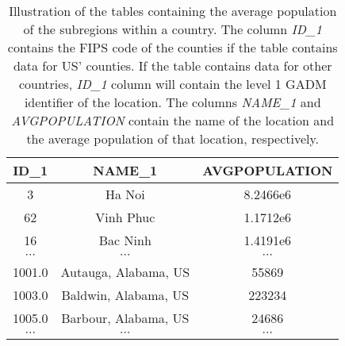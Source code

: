 \begin{table}[h]
\centering
\begin{tabular}{| c | c | c |}
    ID\_1 & NAME\_1 & AVGPOPULATION \\
    \hline\hline
    3 & Ha Noi & 8.2466e6 \\
    \hline
    62 & Vinh Phuc & 1.1712e6 \\
    \hline
    16 & Bac Ninh & 1.4191e6 \\
    \hline
    $\cdots$ & $\cdots$ & $\cdots$ \\
    \hline
    1001.0 & Autauga, Alabama, US & 55869 \\
    \hline
    1003.0 & Baldwin, Alabama, US & 223234 \\
    \hline
    1005.0 & Barbour, Alabama, US & 24686 \\
    \hline
    $\cdots$ & $\cdots$ & $\cdots$ \\
\end{tabular}
\caption{Illustration of the tables containing the average population of the subregions within a country. The column \textit{ID\_1} contains the FIPS code of the counties if the table contains data for US' counties. If the table contains data for other countries, \textit{ID\_1} column will contain the level 1 GADM identifier of the location. The columns \textit{NAME\_1} and \textit{AVGPOPULATION} contain the name of the location and the average population of that location, respectively.}
\label{tab:country-subdivision-population}
\end{table}